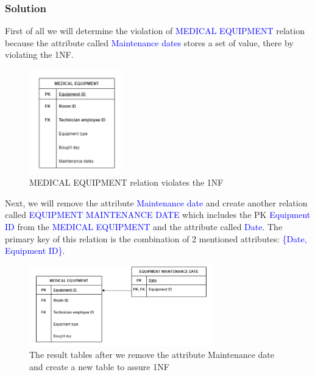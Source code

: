 \documentclass[a4paper]{article}
\numberwithin{equation}{section}
\begin{document}
\subsubsection{Solution}
First of all we will determine the violation of \textcolor{blue}{MEDICAL EQUIPMENT} relation because the attribute called \textcolor{blue}{Maintenance dates} stores a set of value, there by violating the 1NF\@.
\begin{figure}[H]
  \centering
  \includegraphics[width = 4cm ]{assets/1NFviolation.PNG}
  \caption{MEDICAL EQUIPMENT relation violates the 1NF }
\end{figure}

Next, we will remove the attribute \textcolor{blue}{Maintenance date} and create another relation called \textcolor{blue}{EQUIPMENT MAINTENANCE DATE} which includes the PK \textcolor{blue}{Equipment ID} from the \textcolor{blue}{MEDICAL EQUIPMENT} and the attribute called \textcolor{blue}{Date}. The primary key of this relation is the combination of 2 mentioned attributes: \textcolor{blue}{\{Date, Equipment ID\}}.

\begin{figure}[H]
  \centering
  \includegraphics[width = 8cm ]{assets/1NFsolution.PNG}
  \captionsetup{justification=centering,margin=2cm}
  \caption{The result tables after we remove the attribute Maintenance date and create a new table to assure 1NF }
\end{figure}
\end{document}
